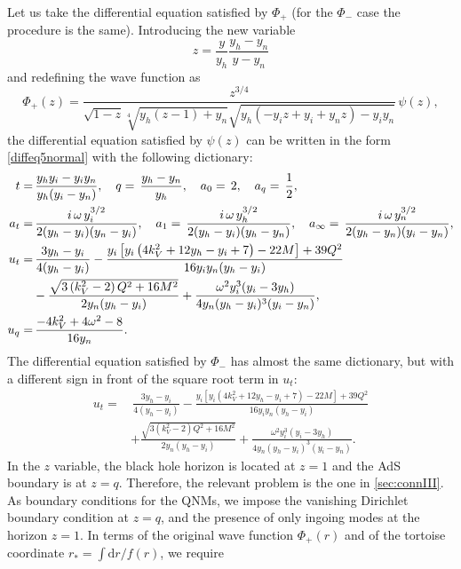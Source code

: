 \documentclass[11pt]{article}
\numberwithin{equation}{section}
\begin{document}
Let us take the differential equation satisfied by $\Phi_+$ (for the $\Phi_-$ case  the procedure is the same). Introducing the new variable 
\begin{equation}
z=\frac{y}{y_h}\frac{y_h-y_n}{y-y_n}
\end{equation}
and redefining the wave function as
\begin{equation}
\Phi_{+}(z)=\frac{z^{3/4}}{\sqrt{1-z} \sqrt[4]{y_h (z-1)+y_n} \sqrt{y_h (-y_i z+y_i+y_n z)-y_i y_n}}\,\psi(z),
\end{equation}
the differential equation satisfied by $\psi(z)$ can be written in the form \eqref{diffeq5normal}
%
with the following dictionary:
\begin{equation}\label{eq:dicRN}
\begin{aligned}\small
t=&\,\frac{y_h y_i-y_i y_n}{y_h (y_i-y_n)},\quad
q=\,\frac{y_h-y_n}{y_h},\quad
a_0=\,2,\quad a_{q}=\,\frac{1}{2},\\
a_t=&\,\frac{i\,\omega\,y_i^{3/2}}{2 (y_h-y_i) (y_n-y_i)},\quad
a_1=\,\frac{i\,\omega\, y_h^{3/2}}{2 (y_h-y_i) (y_h-y_n)},\quad
a_{\infty}=\,\frac{i\,\omega\,y_n^{3/2}}{2 (y_h-y_n) (y_i-y_n)},\\
u_t=&\,\frac{3 y_h-y_i}{4 (y_h-y_i)}-\frac{y_i \left[y_i \left(4 k_V^2+12 y_h-y_i+7\right)-22 M\right]+39 Q^2}{16 y_i y_n (y_h-y_i)}\\
&-\frac{\sqrt{3 \left(k_V^2-2\right) Q^2+16 M^2}}{2 y_n (y_h-y_i)}+\frac{ \omega ^2 y_i^3 (y_i-3 y_h)}{4 y_n (y_h-y_i)^3 (y_i-y_n)},\\
u_{q}=&\,\frac{-4 k_V^2+4 \omega ^2-8}{16 y_n}.
\end{aligned}
\end{equation}
The differential equation satisfied by $\Phi_-$ has almost the same dictionary, but with a different sign in front of the square root term in $u_t$:
\begin{equation}
\begin{aligned}
u_t=&\,\frac{3 y_h-y_i}{4 (y_h-y_i)}-\frac{y_i \left[y_i \left(4 k_V^2+12 y_h-y_i+7\right)-22 M\right]+39 Q^2}{16 y_i y_n (y_h-y_i)}\\
&+\frac{\sqrt{3 \left(k_V^2-2\right) Q^2+16 M^2}}{2 y_n (y_h-y_i)}+\frac{ \omega ^2 y_i^3 (y_i-3 y_h)}{4 y_n (y_h-y_i)^3 (y_i-y_n)}.
\end{aligned}
\end{equation}
%
%
In the $z$ variable, the black hole horizon is located at $z=1$ and the AdS boundary is at $z=q$.  Therefore, the relevant problem is the one in \autoref{sec:connIII}. As boundary conditions for the QNMs, we impose the vanishing Dirichlet boundary condition at $z=q$, and the presence of only ingoing modes at the horizon $z=1$. In terms of the original wave function $\Phi_+(r)$ and of the tortoise coordinate $r_*=\int \mathrm{d}r/f(r)$, we require 
\end{document}
